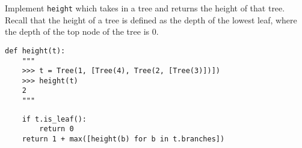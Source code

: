 \begin{blocksection}
\question Implement \lstinline$height$ which takes in a 
tree and returns the height of that tree. Recall that the
height of a tree is defined as the depth of the lowest leaf,
where the depth of the top node of the tree is 0.

\begin{lstlisting}
def height(t):
    """
    >>> t = Tree(1, [Tree(4), Tree(2, [Tree(3)])])
    >>> height(t)
    2
    """
\end{lstlisting}

\begin{solution}[2in]
\begin{lstlisting}
    if t.is_leaf():
        return 0
    return 1 + max([height(b) for b in t.branches])
\end{lstlisting}
\end{solution}
\end{blocksection}
